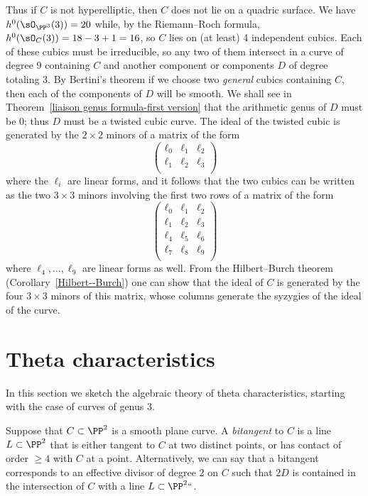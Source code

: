 Thus if $C$ is not hyperelliptic, then $C$ does not lie on a quadric
surface. We have $h^0(\sO_{\PP^3}(3)) = 20$ while, by the Riemann--Roch
formula, $h^0(\sO_C(3)) = 18-3+1= 16$, so $C$ lies on (at least) 4
independent cubics. Each of these cubics must be irreducible, so any
two of them
intersect in a curve of degree 9 containing $C$ and another component
or components $D$ of degree totaling 3. By
Bertini's theorem
%
if we choose two \emph{general} cubics containing $C$, then each of the
components of $D$ will be smooth. We shall see in
Theorem~\ref{liaison genus formula-first version}
that the arithmetic genus of $D$ must be 0;
thus $D$ must be a
twisted cubic
%
 curve. The ideal of the twisted cubic
is generated by the $2\times 2$ minors of a matrix of the form
$$
\begin{pmatrix}
 \ell_0& \ell_1&\ell_2\\
 \ell_1& \ell_2&\ell_3\\
\end{pmatrix}
$$
where the $\ell_i$ are linear forms,
and it follows that the two cubics can be written as the two $3\times 3$
minors involving the first two rows of  a matrix of the form
$$
\begin{pmatrix}
\label{hilbert-burch matrix}
 \ell_0& \ell_1&\ell_2\\
 \ell_1& \ell_2&\ell_3\\
\ell_4& \ell_5&\ell_6\\
 \ell_7& \ell_8&\ell_9\\
\end{pmatrix}
$$
where $\ell_4,\dots,\ell_9$ are linear forms as well.
From the
Hilbert--Burch theorem
%
(Corollary~\ref{Hilbert--Burch}) one can
show that the ideal of $C$ is generated by the four $3\times 3$ minors
of this matrix, whose columns generate
the
syzygies
%
of the ideal of the curve.

\section{Theta characteristics}

In this section we sketch the algebraic theory of theta characteristics,
%
starting with the case of curves of genus 3.

Suppose that $C \subset \PP^2$ is a smooth plane curve. A \emph{bitangent}
%
to $C$ is a line $L \subset \PP^2$ that is either tangent to $C$ at
two distinct points, or has contact of order $\geq 4$ with $C$ at a
point. Alternatively, we can say that a bitangent  corresponds to an
effective divisor of degree 2 on $C$ such that $2D$ is contained in the
intersection of $C$ with a line $L \subset \PP^2` `$.

